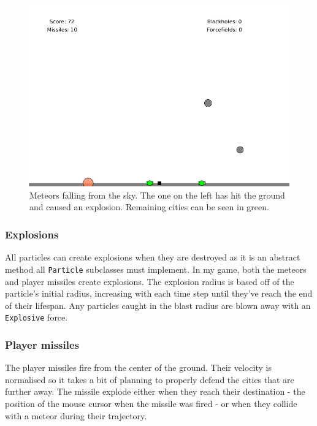 \documentclass{article}
\begin{document}
\begin{figure}[H]
\centering
\includegraphics[width=1\textwidth, keepaspectratio]{imgs/Meteors.png}
\caption{Meteors falling from the sky. The one on the left has hit the ground and caused an explosion. Remaining cities can be seen in green.}
\end{figure}

\subsubsection*{Explosions}
All particles can create explosions when they are destroyed as it is an abstract method all \texttt{Particle} subclasses must implement. In my game, both the meteors and player missiles create explosions. The explosion radius is based off of the particle's initial radius, increasing with each time step until they've reach the end of their lifespan. Any particles caught in the blast radius are blown away with an \texttt{Explosive} force. 

\subsubsection*{Player missiles}
The player missiles fire from the center of the ground. Their velocity is normalised so it takes a bit of planning to properly defend the cities that are further away. The missile explode either when they reach their destination - the position of the mouse cursor when the missile was fired - or when they collide with a meteor during their trajectory. 
\end{document}
